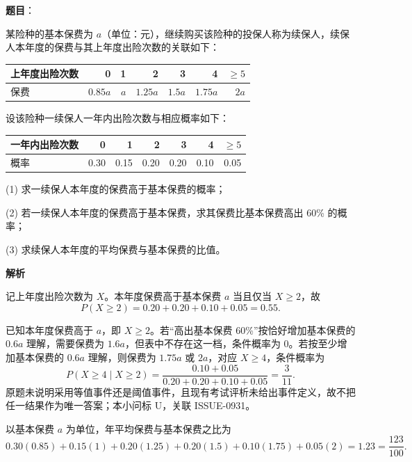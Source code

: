 \begin{answer}

\textbf{题目}：

某险种的基本保费为 \(a\)（单位：元），继续购买该险种的投保人称为续保人，续保人本年度的保费与其上年度出险次数的关联如下：

\begin{center}
\begin{tabular}{lrrrrrr}
\toprule
上年度出险次数 & 0 & 1 & 2 & 3 & 4 & \(\geq5\) \\
\midrule
保费 & \(0.85a\) & \(a\) & \(1.25a\) & \(1.5a\) & \(1.75a\) & \(2a\) \\
\bottomrule
\end{tabular}
\end{center}

设该险种一续保人一年内出险次数与相应概率如下：

\begin{center}
\begin{tabular}{lrrrrrr}
\toprule
一年内出险次数 & 0 & 1 & 2 & 3 & 4 & \(\geq5\) \\
\midrule
概率 & 0.30 & 0.15 & 0.20 & 0.20 & 0.10 & 0.05 \\
\bottomrule
\end{tabular}
\end{center}

   (1) 求一续保人本年度的保费高于基本保费的概率；

   (2) 若一续保人本年度的保费高于基本保费，求其保费比基本保费高出 60\% 的概率；

   (3) 求续保人本年度的平均保费与基本保费的比值。

\textbf{解析}


记上年度出险次数为 \(X\)。本年度保费高于基本保费 \(a\) 当且仅当 \(X\ge2\)，故
\nopagebreak[4]
\[
P(X\ge2)=0.20+0.20+0.10+0.05=0.55.
\]


已知本年度保费高于 \(a\)，即 \(X\ge2\)。若“高出基本保费 60\%”按恰好增加基本保费的 \(0.6a\) 理解，需要保费为 \(1.6a\)，但表中不存在这一档，条件概率为 0。若按至少增加基本保费的 \(0.6a\) 理解，则保费为 \(1.75a\) 或 \(2a\)，对应 \(X\ge4\)，条件概率为
\nopagebreak[4]
\[
P(X\ge4\mid X\ge2)=\frac{0.10+0.05}{0.20+0.20+0.10+0.05}=\frac3{11}.
\]
原题未说明采用等值事件还是阈值事件，且现有考试评析未给出事件定义，故不把任一结果作为唯一答案；本小问标 U，关联 ISSUE-0931。


以基本保费 \(a\) 为单位，年平均保费与基本保费之比为
\nopagebreak[4]
\[
0.30(0.85)+0.15(1)+0.20(1.25)+0.20(1.5)+0.10(1.75)+0.05(2)=1.23=\frac{123}{100}.
\]




\end{answer}
